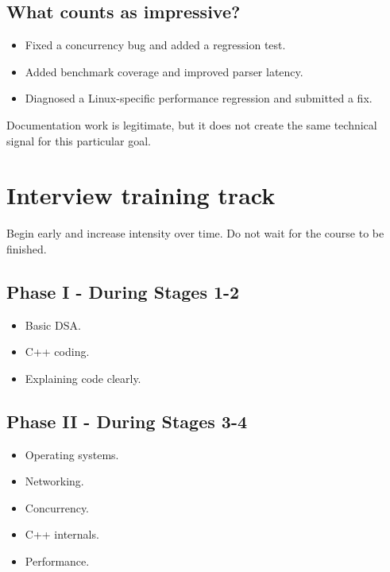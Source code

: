 \documentclass[11pt,letterpaper]{article}
\begin{document}
\subsection*{What counts as impressive?}

\begin{itemize}

\item Fixed a concurrency bug and added a regression test.

\item Added benchmark coverage and improved parser latency.

\item Diagnosed a Linux-specific performance regression and submitted a fix.

\end{itemize}

Documentation work is legitimate, but it does not create the same technical signal for this particular goal.

\section{Interview training track}\label{sec:14}

Begin early and increase intensity over time. Do not wait for the course to be finished.

\subsection*{Phase I - During Stages 1-2}

\begin{itemize}

\item Basic DSA.

\item C++ coding.

\item Explaining code clearly.

\end{itemize}

\subsection*{Phase II - During Stages 3-4}

\begin{itemize}

\item Operating systems.

\item Networking.

\item Concurrency.

\item C++ internals.

\item Performance.

\end{itemize}
\end{document}
